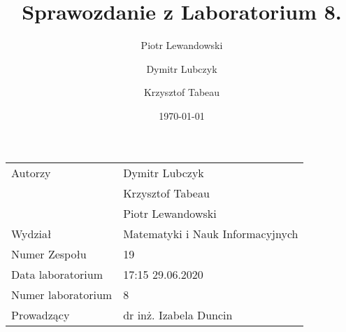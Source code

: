\documentclass{article}
\title{Sprawozdanie z Laboratorium 8.}
\author{Piotr Lewandowski \and Dymitr Lubczyk \and Krzysztof Tabeau }
\date{\today}
\begin{document}
\maketitle
\begin{tabular}{|l|l|}
\hline
Autorzy             & Dymitr Lubczyk                    \\
                    & Krzysztof Tabeau                  \\
                    & Piotr Lewandowski                 \\
Wydział             & Matematyki i Nauk Informacyjnych  \\
Numer Zespołu       & 19                                \\
Data laboratorium   & 17:15 29.06.2020                  \\
Numer laboratorium  & 8                                 \\
Prowadzący          & dr inż. Izabela Duncin         \\
\hline
\end{tabular}
\end{document}
